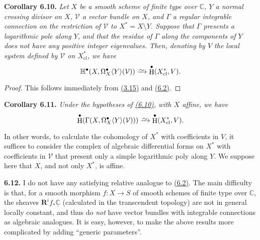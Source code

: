 \documentclass{report}
\newenvironment{itenv}[1]
  {\phantomsection\par\medskip\noindent\textbf{#1.}\itshape}
  {\par\medskip}
\newenvironment{rmenv}[1]
  {\phantomsection\par\medskip\noindent\textbf{#1.}\rmfamily}
  {\par\medskip}
\renewcommand{\cal}[1]{{\mathcal{#1}}}
\newcommand{\CC}{\mathbb{C}}
\newcommand{\RR}{\mathbf{R}}
\newcommand{\cl}{\mathrm{cl}}
\newcommand{\simto}{\xrightarrow{\raisebox{-0.7ex}[0ex][0ex]{$\sim$}}}
\DeclareMathOperator{\HH}{H}
\newcommand{\oldpage}[1]{\marginpar{\footnotesize$\Big\vert$ \textit{p.~#1}}}
\begin{document}
\begin{itenv}{Corollary 6.10}
\label{II.6.10}
  Let $X$ be a smooth scheme of finite type over $\CC$, $Y$ a normal crossing divisor on $X$, $\cal{V}$ a vector bundle on $X$, and $\Gamma$ a regular integrable connection on the restriction of $\cal{V}$ to $X^*=X\setminus Y$.
  Suppose that $\Gamma$ presents a logarithmic pole along $Y$, and that the residue of $\Gamma$ along the components of $Y$ does not have any positive integer eigenvalues.
  Then, denoting by $V$ the local system defined by $\cal{V}$ on $X_\cl^*$, we have
  \[
    \mathbb{H}^\bullet(X,\Omega_X^\bullet\langle Y\rangle(\cal{V}))
    \simto \HH^\bullet(X_\cl^*,V).
  \]
\end{itenv}

\begin{proof}
  This follows immediately from \hyperref[II.3.15]{(3.15)} and \hyperref[II.6.2]{(6.2)}.
\end{proof}

\begin{itenv}{Corollary 6.11}
\label{II.6.11}
  Under the hypotheses of \hyperref[II.6.10]{(6.10)}, with $X$ affine, we have
  \[
    \HH^\bullet(\Gamma(X,\Omega_X^\bullet\langle Y\rangle(\cal{V})))
    \simto \HH^\bullet(X_\cl^*,V).
  \]
\end{itenv}

In other words, to calculate the cohomology of $X^*$ with coefficients in $V$, it suffices to consider the complex of algebraic differential forms on $X^*$ with coefficients in $\cal{V}$ that present only a simple logarithmic poly along $Y$.
We suppose here that $X$, and not only $X^*$, is affine.

\begin{rmenv}{6.12}
\label{II.6.12}
  I do not have any satisfying relative analogue to \hyperref[II.6.2]{(6.2)}.
\oldpage{106}
  The main difficulty is that, for a smooth morphism $f\colon X\to S$ of smooth schemes of finite type over $\CC$, the sheaves $\RR^i f_*\underline{\CC}$ (calculated in the transcendent topology) are not in general locally constant, and thus do \emph{not} have vector bundles with integrable connections as algebraic analogues.
  It is easy, however, to make the above results more complicated by adding ``generic parameters''.
\end{rmenv}
\end{document}
